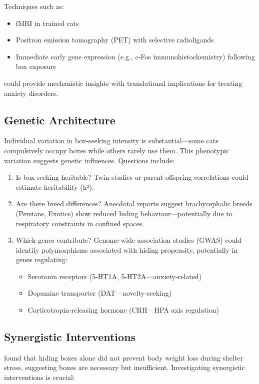 \documentclass[12pt,a4paper]{article}
\begin{document}
Techniques such as:
\begin{itemize}
    \item fMRI in trained cats \citep{johnson2021}
    \item Positron emission tomography (PET) with selective radioligands
    \item Immediate early gene expression (e.g., c-Fos immunohistochemistry) following box exposure
\end{itemize}

could provide mechanistic insights with translational implications for treating anxiety disorders.

\subsection{Genetic Architecture}

Individual variation in box-seeking intensity is substantial—some cats compulsively occupy boxes while others rarely use them. This phenotypic variation suggests genetic influences. Questions include:

\begin{enumerate}
    \item Is box-seeking heritable? Twin studies or parent-offspring correlations could estimate heritability (h²).
    \item Are there breed differences? Anecdotal reports suggest brachycephalic breeds (Persians, Exotics) show reduced hiding behaviour—potentially due to respiratory constraints in confined spaces.
    \item Which genes contribute? Genome-wide association studies (GWAS) could identify polymorphisms associated with hiding propensity, potentially in genes regulating:
    \begin{itemize}
        \item Serotonin receptors (5-HT1A, 5-HT2A—anxiety-related)
        \item Dopamine transporter (DAT—novelty-seeking)
        \item Corticotropin-releasing hormone (CRH—HPA axis regulation)
    \end{itemize}
\end{enumerate}

\subsection{Synergistic Interventions}

\citet{vinke2014} found that hiding boxes alone did not prevent body weight loss during shelter stress, suggesting boxes are necessary but insufficient. Investigating synergistic interventions is crucial:
\end{document}
